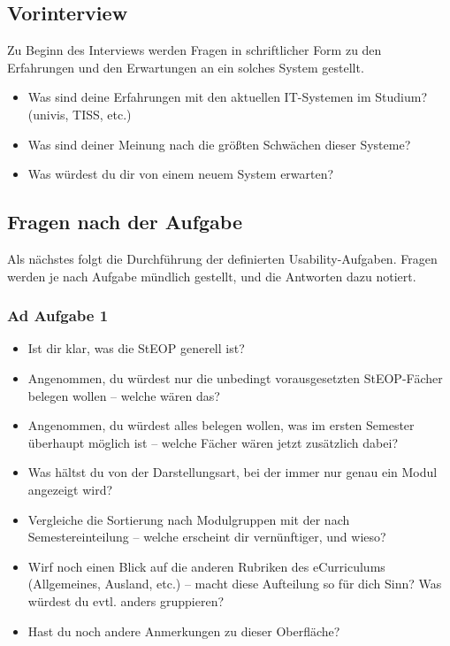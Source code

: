 \documentclass[a4paper,10pt]{scrartcl}
\begin{document}
\subsection{Vorinterview}

Zu Beginn des Interviews werden Fragen in schriftlicher Form zu den Erfahrungen und den Erwartungen an ein solches System gestellt.

\begin{itemize}
 \item Was sind deine Erfahrungen mit den aktuellen IT-Systemen im Studium? (univis, TISS, etc.)
 \item Was sind deiner Meinung nach die größten Schwächen dieser Systeme?
 \item Was würdest du dir von einem neuem System erwarten?
\end{itemize}

\subsection{Fragen nach der Aufgabe}

Als nächstes folgt die Durchführung der definierten Usability-Aufgaben. Fragen werden je nach Aufgabe mündlich gestellt, und die Antworten dazu notiert.

\subsubsection*{Ad Aufgabe 1}

\begin{itemize}
 \item Ist dir klar, was die StEOP generell ist?
 \item Angenommen, du würdest nur die unbedingt vorausgesetzten StEOP-Fächer belegen wollen -- welche wären das?
 \item Angenommen, du würdest alles belegen wollen, was im ersten Semester überhaupt möglich ist -- welche Fächer wären jetzt zusätzlich dabei?
 \item Was hältst du von der Darstellungsart, bei der immer nur genau ein Modul angezeigt wird?
 \item Vergleiche die Sortierung nach Modulgruppen mit der nach Semestereinteilung -- welche erscheint dir vernünftiger, und wieso?
 \item Wirf noch einen Blick auf die anderen Rubriken des eCurriculums (Allgemeines, Ausland, etc.) -- macht diese Aufteilung so für dich Sinn? Was würdest du evtl. anders gruppieren?
 \item Hast du noch andere Anmerkungen zu dieser Oberfläche?
\end{itemize}
\end{document}
